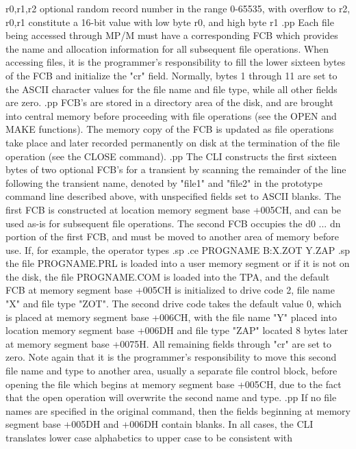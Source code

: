     r0,r1,r2 optional random record number in the
             range 0-65535, with overflow to r2,
             r0,r1 constitute a 16-bit value with
             low byte r0, and high byte r1
.pp
Each file being accessed through MP/M must have a corresponding
FCB which provides the name and allocation information for all
subsequent file operations.  When accessing files, it is the
programmer's responsibility to fill the lower sixteen bytes
of the FCB and initialize the "cr" field.  Normally,
bytes 1 through 11 are set to the ASCII character
values for the file name and file type, while all other
fields are zero.
.pp
FCB's are stored in a directory area of the disk, and are
brought into central memory before proceeding with file
operations (see the OPEN and MAKE functions).  The memory
copy of the FCB is updated as file operations take place
and later recorded permanently on disk at the termination
of the file operation (see the CLOSE command).
.pp
The CLI constructs the first sixteen bytes of two optional
FCB's for a transient by scanning the remainder of the line
following the transient name, denoted by "file1" and "file2"
in the prototype command line described above,
with unspecified fields set to ASCII blanks.  The first
FCB is constructed at location memory segment base +005CH, and can
be used as-is for subsequent file operations.  The second
FCB occupies the d0 ... dn portion of the first FCB,
and must be moved to another area of memory before use.
If, for example, the operator types
.sp
.ce
PROGNAME B:X.ZOT Y.ZAP
.sp
the file PROGNAME.PRL is loaded into a user memory segment or if
it is not on the disk,
the file PROGNAME.COM is loaded into the TPA, and the default
FCB at memory segment base +005CH is initialized to drive code 2, file
name "X" and file type "ZOT".  The second drive code takes
the default value 0, which is placed at memory segment base +006CH,
with the file name "Y" placed into location memory segment base +006DH
and file type "ZAP" located 8 bytes later at memory segment base +0075H.
All remaining fields through "cr" are set to zero.  Note again
that it is the programmer's responsibility to move this second
file name and type to another area, usually a separate file
control block, before opening the file which begins at
memory segment base +005CH, due to the fact that the open operation
will overwrite the second name and type.
.pp
If no file names are specified in the original command,
then the fields beginning at memory segment base +005DH and +006DH
contain blanks.  In all cases, the CLI translates lower
case alphabetics to upper case to be consistent with
